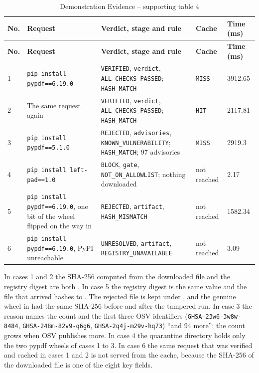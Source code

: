 \setlength{\tabcolsep}{3pt}
\begin{longtable}{p{}p{}p{}p{}p{}}
\caption{Demonstration Evidence -- supporting table 4}\\
\toprule
\textbf{No.} & \textbf{Request} & \textbf{Verdict, stage and rule} & \textbf{Cache} & \textbf{Time (ms)}\\
\midrule
\endfirsthead
\toprule
\textbf{No.} & \textbf{Request} & \textbf{Verdict, stage and rule} & \textbf{Cache} & \textbf{Time (ms)}\\
\midrule
\endhead
1 & \texttt{pip install pypdf==6.19.0} & \texttt{VERIFIED}, \texttt{verdict}, \texttt{ALL\_CHECKS\_PASSED}; \texttt{HASH\_MATCH} & \texttt{MISS} & 3912.65\\
2 & The same request again & \texttt{VERIFIED}, \texttt{verdict}, \texttt{ALL\_CHECKS\_PASSED}; \texttt{HASH\_MATCH} & \texttt{HIT} & 2117.81\\
3 & \texttt{pip install pypdf==5.1.0} & \texttt{REJECTED}, \texttt{advisories}, \texttt{KNOWN\_VULNERABILITY}; \texttt{HASH\_MATCH}; 97 advisories & \texttt{MISS} & 2919.3\\
4 & \texttt{pip install left-pad==1.0} & \texttt{BLOCK}, \texttt{gate}, \texttt{NOT\_ON\_ALLOWLIST}; nothing downloaded & not reached & 2.17\\
5 & \texttt{pip install pypdf==6.19.0}, one bit of the wheel flipped on the way in & \texttt{REJECTED}, \texttt{artifact}, \texttt{HASH\_MISMATCH} & not reached & 1582.34\\
6 & \texttt{pip install pypdf==6.19.0}, PyPI unreachable & \texttt{UNRESOLVED}, \texttt{artifact}, \texttt{REGISTRY\_UNAVAILABLE} & not reached & 3.09\\
\bottomrule
\end{longtable}
\setlength{\tabcolsep}{6pt}

\begin{sloppypar}
In cases 1 and 2 the SHA-256 computed from the downloaded file and the registry digest are both . In case 5 the registry digest is the same value and the file that arrived hashes to . The rejected file is kept under , and the genuine wheel in  had the same SHA-256 before and after the tampered run. In case 3 the reason names the count and the first three OSV identifiers (\texttt{GHSA-23w6-3w8w-8484}, \texttt{GHSA-248m-82v9-q6g6}, \texttt{GHSA-2q4j-m29v-hq73}) ``and 94 more''; the count grows when OSV publishes more. In case 4 the quarantine directory holds only the two pypdf wheels of cases 1 to 3. In case 6 the same request that was verified and cached in cases 1 and 2 is not served from the cache, because the SHA-256 of the downloaded file is one of the eight key fields.
\end{sloppypar}

